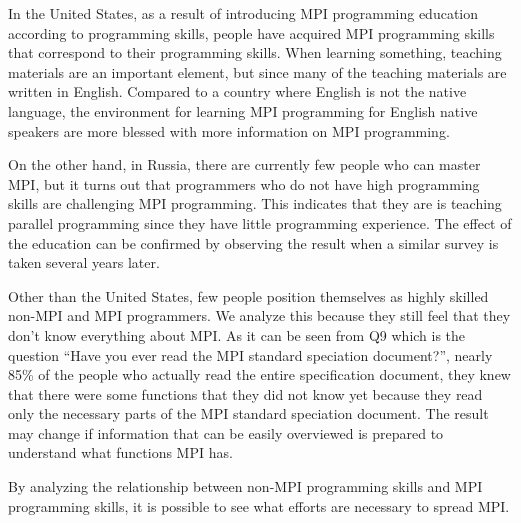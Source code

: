 In the United States, as a result of introducing MPI programming education according to programming skills, people have acquired MPI programming skills that correspond to their programming skills. When learning something, teaching materials are an important element, but since many of the teaching materials are written in English. Compared to a country where English is not the native language, the environment for learning MPI programming for English native speakers are more blessed with more information on MPI programming.

On the other hand, in Russia, there are currently few people who can master MPI, but it turns out that programmers who do not have high programming skills are challenging MPI programming. This indicates that they are is teaching parallel programming since they have little programming experience. The effect of the education can be confirmed by observing the result when a similar survey is taken several years later.

Other than the United States, few people position themselves as highly skilled non-MPI and MPI programmers. We analyze this because they still feel that they don't know everything about MPI. As it can be seen from Q9 which is the question “Have you ever read the MPI standard speciation document?”, nearly 85\% of the people who actually read the entire specification document, they knew that there were some functions that they did not know yet because they read only the necessary parts of the MPI standard speciation document. The result may change if information that can be easily overviewed is prepared to understand what functions MPI has.

By analyzing the relationship between non-MPI programming skills and MPI programming skills, it is possible to see what efforts are necessary to spread MPI.

